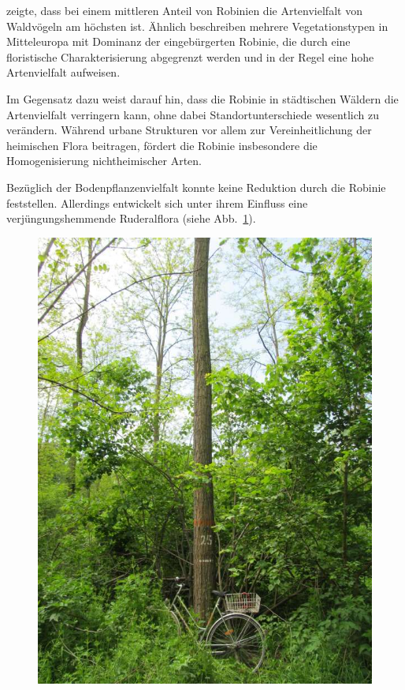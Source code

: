 \documentclass[twocolumn]{scrartcl}
\begin{document}
\citet{kraftova2017robinieVoegel} zeigte, dass bei einem mittleren
Anteil von Robinien die Artenvielfalt von Waldvögeln am höchsten
ist. Ähnlich beschreiben \citet{vitkova2010robinieVegTyp} mehrere
Vegetationstypen in Mitteleuropa mit Dominanz der eingebürgerten
Robinie, die durch eine floristische Charakterisierung abgegrenzt
werden und in der Regel eine hohe Artenvielfalt aufweisen.

Im Gegensatz dazu weist \citet{trentanovi2013robinie} darauf hin, dass
die Robinie in städtischen Wäldern die Artenvielfalt verringern kann,
ohne dabei Standortunterschiede wesentlich zu verändern. Während
urbane Strukturen vor allem zur Vereinheitlichung der heimischen Flora
beitragen, fördert die Robinie insbesondere die Homogenisierung
nichtheimischer Arten.

Bezüglich der Bodenpflanzenvielfalt konnte \citet{sitzia2012robinie}
keine Reduktion durch die Robinie feststellen. Allerdings entwickelt
sich unter ihrem Einfluss eine verjüngungshemmende Ruderalflora (siehe
Abb.~\ref{fig:glaswein}).

\begin{figure}[htbp]
  \centering
  \includegraphics[width=.9\linewidth]{./bild/GlasweinRobinie2023a}
  \label{fig:glaswein}
\end{figure}
\end{document}
